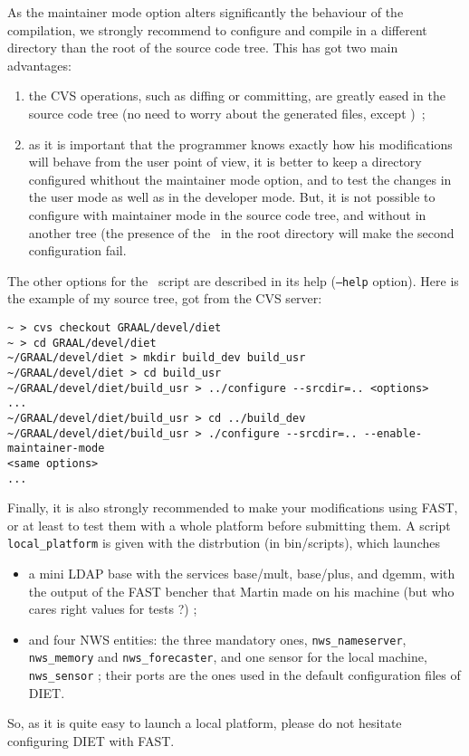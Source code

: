 As the maintainer mode option alters significantly the behaviour of
the compilation, we strongly recommend to configure and compile in a
different directory than the root of the source code tree. This has
got two main advantages:
\begin{enumerate}
\item{the CVS operations, such as diffing or committing, are greatly
    eased in the source code tree (no need to worry about the
    generated files, except \makein)~;}
\item{as it is important that the programmer knows exactly how his
  modifications will behave from the user point of view, it is better
  to keep a directory configured whithout the maintainer mode option,
  and to test the changes in the user mode as well as in the developer
  mode. But, it is not possible to configure with maintainer mode in
  the source code tree, and without in another tree (the presence of
  the \make\ in the root directory will make the second configuration
  fail.}
\end{enumerate}
The other options for the \configure\ script are described in its help
(\texttt{--help} option). Here is the example of my source tree, got
from the CVS server:
\begin{verbatim}
~ > cvs checkout GRAAL/devel/diet
~ > cd GRAAL/devel/diet
~/GRAAL/devel/diet > mkdir build_dev build_usr
~/GRAAL/devel/diet > cd build_usr
~/GRAAL/devel/diet/build_usr > ../configure --srcdir=.. <options>
...
~/GRAAL/devel/diet/build_usr > cd ../build_dev
~/GRAAL/devel/diet/build_usr > ./configure --srcdir=.. --enable-maintainer-mode
<same options>
...
\end{verbatim}

Finally, it is also strongly recommended to make your modifications
using FAST, or at least to test them with a whole platform before
submitting them. A script \texttt{local\_platform} is given with the
distrbution (in \textsf{bin/scripts}), which launches
\begin{itemize}
\item a mini LDAP base with the services \textsf{base/mult},
  \textsf{base/plus}, and \textsf{dgemm}, with the output of the FAST
  bencher that Martin made on his machine (but who cares right values
  for tests ?) ;
\item and four NWS entities: the three mandatory ones,
  \texttt{nws\_nameserver}, \texttt{nws\_memory} and
  \texttt{nws\_forecaster}, and one sensor for the local machine,
  \texttt{nws\_sensor} ; their ports are the ones used in the default
  configuration files of DIET.
\end{itemize}
So, as it is quite easy to launch a local platform, please do not
hesitate configuring DIET with FAST.


